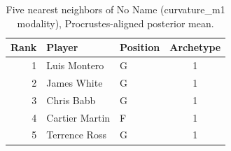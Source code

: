 \begin{table}[htbp]
  \centering\small
  \begin{tabular}{rllc}
    \toprule
    Rank & Player & Position & Archetype \\
    \midrule
    1 & Luis Montero & G & 1 \\
    2 & James White & G & 1 \\
    3 & Chris Babb & G & 1 \\
    4 & Cartier Martin & F & 1 \\
    5 & Terrence Ross & G & 1 \\
    \bottomrule
  \end{tabular}
  \caption{Five nearest neighbors of No Name (curvature_m1 modality), Procrustes-aligned posterior mean.}
  \label{tab:No_Name_neighbors_curvature_m1}
\end{table}

